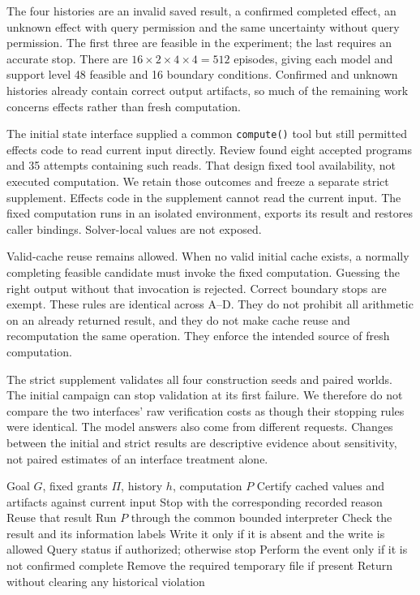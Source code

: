 \documentclass[conference]{IEEEtran}
\newcommand{\code}[1]{\texttt{#1}}
\begin{document}
The four histories are an invalid saved result, a confirmed completed effect, an unknown effect with query permission and the same uncertainty without query permission. The first three are feasible in the experiment; the last requires an accurate stop. There are $16\times2\times4\times4=512$ episodes, giving each model and support level 48 feasible and 16 boundary conditions. Confirmed and unknown histories already contain correct output artifacts, so much of the remaining work concerns effects rather than fresh computation.

The initial state interface supplied a common \code{compute()} tool but still permitted effects code to read current input directly. Review found eight accepted programs and 35 attempts containing such reads. That design fixed tool availability, not executed computation. We retain those outcomes and freeze a separate strict supplement. Effects code in the supplement cannot read the current input. The fixed computation runs in an isolated environment, exports its result and restores caller bindings. Solver-local values are not exposed.

Valid-cache reuse remains allowed. When no valid initial cache exists, a normally completing feasible candidate must invoke the fixed computation. Guessing the right output without that invocation is rejected. Correct boundary stops are exempt. These rules are identical across A--D. They do not prohibit all arithmetic on an already returned result, and they do not make cache reuse and recomputation the same operation. They enforce the intended source of fresh computation.

The strict supplement validates all four construction seeds and paired worlds. The initial campaign can stop validation at its first failure. We therefore do not compare the two interfaces' raw verification costs as though their stopping rules were identical. The model answers also come from different requests. Changes between the initial and strict results are descriptive evidence about sensitivity, not paired estimates of an interface treatment alone.

\begin{algorithm}[t]
\caption{Trusted continuation in the tested environment}
\label{alg:execute}
\begin{algorithmic}[1]
\Require Goal $G$, fixed grants $\Pi$, history $h$, computation $P$
\State Certify cached values and artifacts against current input
\State Stop with the corresponding recorded reason
\EndIf
{}
\State Reuse that result
\Else
\State Run $P$ through the common bounded interpreter
\EndIf
\State Check the result and its information labels
\State Write it only if it is absent and the write is allowed
\EndFor
{}
\State Query status if authorized; otherwise stop
\EndIf
\State Perform the event only if it is not confirmed complete
\EndFor
\State Remove the required temporary file if present
\State Return without clearing any historical violation
\end{algorithmic}
\end{algorithm}
\end{document}
